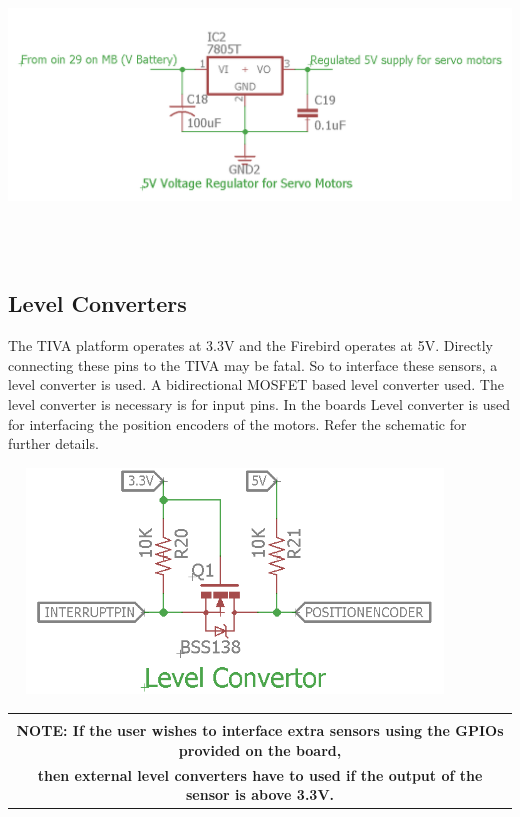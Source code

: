 \documentclass[a4paper,12pt,oneside]{article}
\begin{document}
{	\includegraphics[width=18cm, height=8cm]{Images/ServoPowerSupply}\\			
	\subsection{\textbf{Level Converters}}
	{The TIVA platform operates at 3.3V and the Firebird operates at 5V. Directly connecting these pins to the TIVA may be fatal. So to interface these sensors, a level converter is used. A bidirectional MOSFET based level converter used. The level converter is necessary is for input pins. In the boards Level converter is used for interfacing the position encoders of the motors. Refer the schematic for further details.\\ }
		
	\hspace{3.5cm}
	\includegraphics[width=12cm, height=6cm]{Images/Level_Converter}\\
	\begin{tabular}{|c|}
		\hline
		\\
		\textbf{NOTE: If the user wishes to interface extra sensors using the GPIOs provided on the board,} \\ \textbf{then external level converters have to used if the output of the sensor is above 3.3V.}
		\\
		\hline
	\end{tabular}\\\\
}
\end{document}
